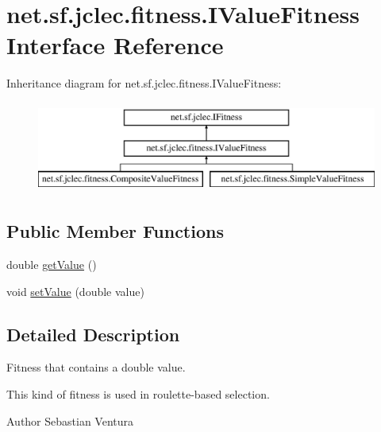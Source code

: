 \hypertarget{interfacenet_1_1sf_1_1jclec_1_1fitness_1_1_i_value_fitness}{\section{net.\-sf.\-jclec.\-fitness.\-I\-Value\-Fitness Interface Reference}
\label{interfacenet_1_1sf_1_1jclec_1_1fitness_1_1_i_value_fitness}
}
Inheritance diagram for net.\-sf.\-jclec.\-fitness.\-I\-Value\-Fitness\-:\begin{figure}[H]
\begin{center}
\leavevmode
\includegraphics[height=3.000000cm]{interfacenet_1_1sf_1_1jclec_1_1fitness_1_1_i_value_fitness}
\end{center}
\end{figure}
\subsection*{Public Member Functions}
\begin{DoxyCompactItemize}
\item 
double \hyperlink{interfacenet_1_1sf_1_1jclec_1_1fitness_1_1_i_value_fitness_aad92cad11870f39ae3edf1207dc3d95a}{get\-Value} ()
\item 
void \hyperlink{interfacenet_1_1sf_1_1jclec_1_1fitness_1_1_i_value_fitness_a3bbd0626c097d3d340e71bdf502b3efe}{set\-Value} (double value)
\end{DoxyCompactItemize}


\subsection{Detailed Description}
Fitness that contains a double value.

This kind of fitness is used in roulette-\/based selection.

\begin{DoxyAuthor}{Author}
Sebastian Ventura 
\end{DoxyAuthor}


